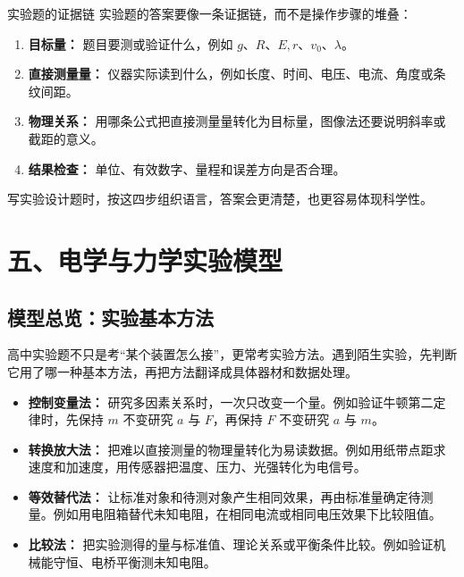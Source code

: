 \newpage
\begin{learningbox}{实验题的证据链}
实验题的答案要像一条证据链，而不是操作步骤的堆叠：
\begin{enumerate}
  \item \textbf{目标量：} 题目要测或验证什么，例如 $g$、$R$、$E,r$、$v_0$、$\lambda$。
  \item \textbf{直接测量量：} 仪器实际读到什么，例如长度、时间、电压、电流、角度或条纹间距。
  \item \textbf{物理关系：} 用哪条公式把直接测量量转化为目标量，图像法还要说明斜率或截距的意义。
  \item \textbf{结果检查：} 单位、有效数字、量程和误差方向是否合理。
\end{enumerate}
写实验设计题时，按这四步组织语言，答案会更清楚，也更容易体现科学性。
\end{learningbox}

\section*{五、电学与力学实验模型}

\subsection*{模型总览：实验基本方法}

高中实验题不只是考“某个装置怎么接”，更常考实验方法。遇到陌生实验，先判断它用了哪一种基本方法，再把方法翻译成具体器材和数据处理。

\begin{center}


\label{fig:experiment-methods-map}
\end{center}

\begin{itemize}
  \item \textbf{控制变量法：} 研究多因素关系时，一次只改变一个量。例如验证牛顿第二定律时，先保持 $m$ 不变研究 $a$ 与 $F$，再保持 $F$ 不变研究 $a$ 与 $m$。
  \item \textbf{转换放大法：} 把难以直接测量的物理量转化为易读数据。例如用纸带点距求速度和加速度，用传感器把温度、压力、光强转化为电信号。
  \item \textbf{等效替代法：} 让标准对象和待测对象产生相同效果，再由标准量确定待测量。例如用电阻箱替代未知电阻，在相同电流或相同电压效果下比较阻值。
  \item \textbf{比较法：} 把实验测得的量与标准值、理论关系或平衡条件比较。例如验证机械能守恒、电桥平衡测未知电阻。
\end{itemize}

